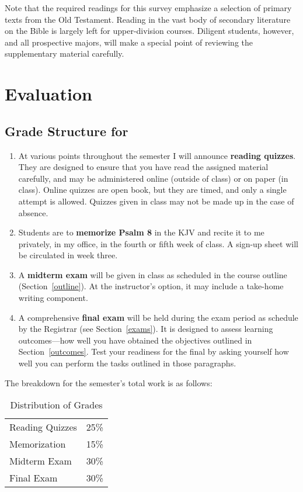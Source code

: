 \documentclass[titlepage]{article}
\begin{document}
Note that the required readings for this survey emphasize a selection of
primary texts from the Old Testament. Reading in the vast body of
secondary literature on the Bible is largely left for upper-division
courses. Diligent students, however, and all prospective majors, will
make a special point of reviewing the supplementary material carefully.

\section{Evaluation}
\label{evaluation}

\subsection{Grade Structure for \ccode}
\label{structure}

\begin{enumerate}
 \item At various points throughout the semester I will announce
   \textbf{reading quizzes}. They are designed to ensure that you have
   read the assigned material carefully, and may be administered online
   (outside of class) or on paper (in class). Online quizzes are open
   book, but they are timed, and only a single attempt is allowed.
   Quizzes given in class may not be made up in the case of absence.
 \item Students are to \textbf{memorize Psalm 8} in the KJV and recite
   it to me privately, in my office, in the fourth or fifth week of
   class. A sign-up sheet will be circulated in week three.
 \item A \textbf{midterm exam} will be given in class as scheduled in
   the course outline (Section~\ref{outline}). At the instructor's
   option, it may include a take-home writing component.
 \item A comprehensive \textbf{final exam} will be held during the exam
   period as schedule by the Registrar (see Section~\ref{exams}). It is
   designed to assess learning outcomes---how well you have obtained the
   objectives outlined in Section~\ref{outcomes}. Test your readiness
   for the final by asking yourself how well you can perform the tasks
   outlined in those paragraphs.
\end{enumerate}

The breakdown for the semester's total work is as follows:

\begin{table}[htbp]
  \centering
  \begin{tabular}{lr}
    \toprule
    Reading Quizzes & 25\% \\
    Memorization    & 15\% \\
    Midterm Exam    & 30\% \\
    Final Exam      & 30\% \\
    \bottomrule
  \end{tabular}
  \caption{Distribution of Grades}
  \label{distribution}
\end{table}
\end{document}
